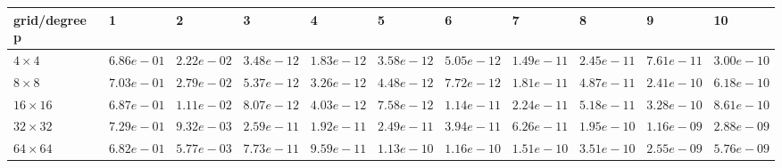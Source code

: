 \begin{tabular}{lllllllllll}
\hline
 grid/degree p   & 1          & 2          & 3          & 4          & 5          & 6          & 7          & 8          & 9          & 10         \\
\hline
 $4 \times 4$    & $6.86e-01$ & $2.22e-02$ & $3.48e-12$ & $1.83e-12$ & $3.58e-12$ & $5.05e-12$ & $1.49e-11$ & $2.45e-11$ & $7.61e-11$ & $3.00e-10$ \\
 $8 \times 8$    & $7.03e-01$ & $2.79e-02$ & $5.37e-12$ & $3.26e-12$ & $4.48e-12$ & $7.72e-12$ & $1.81e-11$ & $4.87e-11$ & $2.41e-10$ & $6.18e-10$ \\
 $16 \times 16$  & $6.87e-01$ & $1.11e-02$ & $8.07e-12$ & $4.03e-12$ & $7.58e-12$ & $1.14e-11$ & $2.24e-11$ & $5.18e-11$ & $3.28e-10$ & $8.61e-10$ \\
 $32 \times 32$  & $7.29e-01$ & $9.32e-03$ & $2.59e-11$ & $1.92e-11$ & $2.49e-11$ & $3.94e-11$ & $6.26e-11$ & $1.95e-10$ & $1.16e-09$ & $2.88e-09$ \\
 $64 \times 64$  & $6.82e-01$ & $5.77e-03$ & $7.73e-11$ & $9.59e-11$ & $1.13e-10$ & $1.16e-10$ & $1.51e-10$ & $3.51e-10$ & $2.55e-09$ & $5.76e-09$ \\
\hline
\end{tabular}